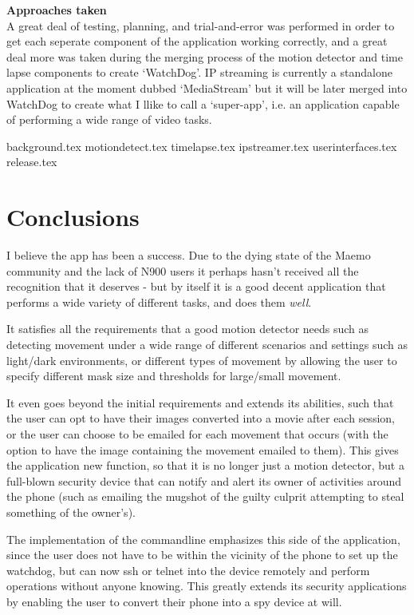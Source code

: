 \documentclass[11pt]{article} %
\begin{document}
{\large\bf Approaches taken}\\
A great deal of testing, planning, and trial-and-error was performed in order to get each seperate component of the application working correctly, and a great deal more was taken during the merging process of the motion detector and time lapse components to create ‘WatchDog’. IP streaming is currently a standalone application at the moment dubbed ‘MediaStream’ but it will be later merged into WatchDog to create what I llike to call a ‘super-app’, i.e. an application capable of performing a wide range of video tasks.

\pagebreak
{background.tex}
\pagebreak
{motiondetect.tex}
\pagebreak
{timelapse.tex}
\pagebreak
{ipstreamer.tex}
{userinterfaces.tex}
{release.tex}

\part{Conclusions}
I believe the app has been a success. Due to the dying state of the Maemo community and the lack of N900 users it perhaps hasn’t received all the recognition that it deserves - but by itself it is a good decent application that performs a wide variety of different tasks, and does them {\it well}.

It satisfies all the requirements that a good motion detector needs such as detecting movement under a wide range of different scenarios and settings such as light/dark environments, or different types of movement by allowing the user to specify different mask size and thresholds for large/small movement.

It even goes beyond the initial requirements and extends its abilities, such that the user can opt to have their images converted into a movie after each session, or the user can choose to be emailed for each movement that occurs (with the option to have the image containing the movement emailed to them). This gives the application new function, so that it is no longer just a motion detector, but a full-blown security device that can notify and alert its owner of activities around the phone (such as emailing the mugshot of the guilty culprit attempting to steal something of the owner’s).

The implementation of the commandline emphasizes this side of the application, since the user does not have to be within the vicinity of the phone to set up the watchdog, but can now ssh or telnet into the device remotely and perform operations without anyone knowing. This greatly extends its security applications by enabling the user to convert their phone into a spy device at will.
\end{document}
